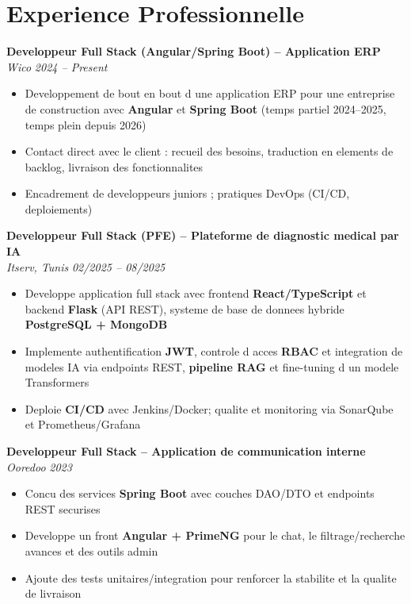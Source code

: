 \documentclass[10pt,a4paper]{article}
\begin{document}
\vspace{6pt}

\section*{Experience Professionnelle}
{\small

\textbf{Developpeur Full Stack (Angular/Spring Boot) -- Application ERP}\\[1pt]
\textit{Wico} \hfill \textit{2024 -- Present}
\begin{itemize}
  \item Developpement de bout en bout d une application ERP pour une entreprise de construction avec \textbf{Angular} et \textbf{Spring Boot} (temps partiel 2024--2025, temps plein depuis 2026)
  \item Contact direct avec le client : recueil des besoins, traduction en elements de backlog, livraison des fonctionnalites
  \item Encadrement de developpeurs juniors ; pratiques DevOps (CI/CD, deploiements)
\end{itemize}

\vspace{3pt}
\textbf{Developpeur Full Stack (PFE) -- Plateforme de diagnostic medical par IA}\\[1pt]
\textit{Itserv, Tunis} \hfill \textit{02/2025 -- 08/2025}
\begin{itemize}
  \item Developpe application full stack avec frontend \textbf{React/TypeScript} et backend \textbf{Flask} (API REST), systeme de base de donnees hybride \textbf{PostgreSQL + MongoDB}
  \item Implemente authentification \textbf{JWT}, controle d acces \textbf{RBAC} et integration de modeles IA via endpoints REST, \textbf{pipeline RAG} et fine-tuning d un modele Transformers
  \item Deploie \textbf{CI/CD} avec Jenkins/Docker; qualite et monitoring via SonarQube et Prometheus/Grafana
\end{itemize}

\vspace{3pt}
\textbf{Developpeur Full Stack -- Application de communication interne}\\[1pt]
\textit{Ooredoo} \hfill \textit{2023}
\begin{itemize}
  \item Concu des services \textbf{Spring Boot} avec couches DAO/DTO et endpoints REST securises
  \item Developpe un front \textbf{Angular + PrimeNG} pour le chat, le filtrage/recherche avances et des outils admin
  \item Ajoute des tests unitaires/integration pour renforcer la stabilite et la qualite de livraison
\end{itemize}

}
\end{document}
